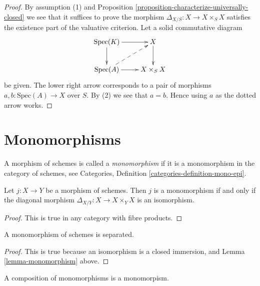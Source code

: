 \begin{proof}
By assumption (1) and
Proposition \ref{proposition-characterize-universally-closed}
we see that it suffices to prove the morphism
$\Delta_{X/S} : X \to X \times_S X$ satisfies the existence
part of the valuative criterion.
Let a solid commutative diagram
$$
\xymatrix{
\text{Spec}(K) \ar[r] \ar[d] & X \ar[d] \\
\text{Spec}(A) \ar[r] \ar@{-->}[ru] & X \times_S X
}
$$
be given. The lower right arrow corresponds to a
pair of morphisms $a, b : \text{Spec}(A) \to X$ over $S$.
By (2) we see that $a = b$. Hence using $a$ as the dotted
arrow works.
\end{proof}





\section{Monomorphisms}
\label{section-monomorphisms}

\begin{definition}
\label{definition-monomorphism}
A morphism of schemes is called a {\it monomorphism} if it is
a monomorphism in the category of schemes, see
Categories, Definition \ref{categories-definition-mono-epi}.
\end{definition}

\begin{lemma}
\label{lemma-monomorphism}
Let $j : X \to Y$ be a morphism of schemes.
Then $j$ is a monomorphism if and only if the
diagonal morphism $\Delta_{X/Y} : X \to X \times_Y X$ is
an isomorphism.
\end{lemma}

\begin{proof}
This is true in any category with fibre products.
\end{proof}

\begin{lemma}
\label{lemma-monomorphism-separated}
A monomorphism of schemes is separated.
\end{lemma}

\begin{proof}
This is true because an isomorphism is a closed immersion,
and Lemma \ref{lemma-monomorphism} above.
\end{proof}

\begin{lemma}
\label{lemma-composition-monomorphism}
A composition of monomorphisms is a monomorpism.
\end{lemma}

